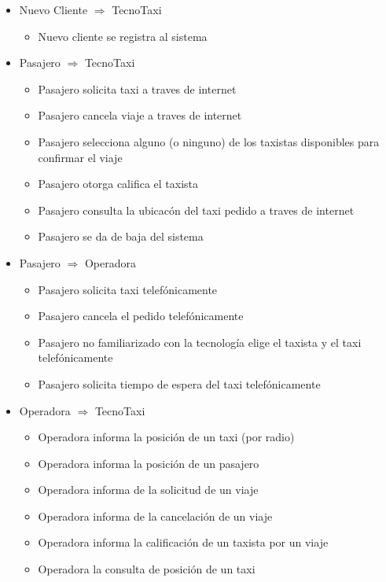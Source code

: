 \begin{itemize}

	\item Nuevo Cliente $\Rightarrow$ TecnoTaxi
	\begin{itemize}
		\item Nuevo cliente se registra al sistema
	\end{itemize}

    \item Pasajero $\Rightarrow$ TecnoTaxi
    \begin{itemize}
        \item Pasajero solicita taxi a traves de internet
        \item Pasajero cancela viaje a traves de internet
        \item Pasajero selecciona alguno (o ninguno) de los taxistas disponibles para confirmar el viaje
        \item Pasajero otorga califica el taxista
        \item Pasajero consulta la ubicac\'on del taxi pedido a traves de internet
        \item Pasajero se da de baja del sistema
    \end{itemize}

    \item Pasajero $\Rightarrow$ Operadora
    \begin{itemize}
         \item Pasajero solicita taxi telef\'onicamente
         \item Pasajero cancela el pedido telef\'onicamente
         \item Pasajero no familiarizado con la tecnolog\'ia elige el taxista y el taxi telef\'onicamente
         \item Pasajero solicita tiempo de espera del taxi telef\'onicamente
    \end{itemize}

   
    \item Operadora $\Rightarrow$ TecnoTaxi
    \begin{itemize}
        \item Operadora informa la posici\'on de un taxi (por radio)
        \item Operadora informa la posici\'on de un pasajero
        \item Operadora informa de la solicitud de un viaje
        \item Operadora informa de la cancelaci\'on de un viaje
        \item Operadora informa la calificaci\'on de un taxista por un viaje
        \item Operadora la consulta de posici\'on de un taxi


\end{itemize}
\end{itemize}
